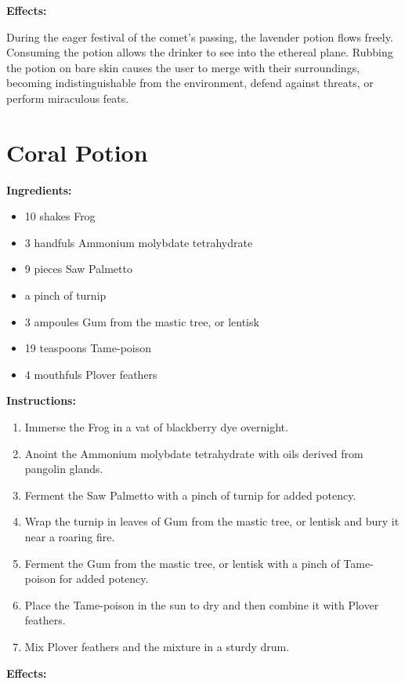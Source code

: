\documentclass{article}
\begin{document}
\textbf{Effects:}

During the eager festival of the comet’s passing, the lavender potion flows freely. Consuming the potion allows the drinker to see into the ethereal plane. Rubbing the potion on bare skin causes the user to merge with their surroundings, becoming indistinguishable from the environment, defend against threats, or perform miraculous feats.

\newpage
\section*{Coral Potion}

\textbf{Ingredients:}

\begin{itemize}
  \item 10 shakes Frog
  \item 3 handfuls Ammonium molybdate tetrahydrate
  \item 9 pieces Saw Palmetto
  \item a pinch of turnip
  \item 3 ampoules Gum from the mastic tree, or lentisk
  \item 19 teaspoons Tame-poison
  \item 4 mouthfuls Plover feathers
\end{itemize}

\textbf{Instructions:}

\begin{enumerate}
  \item Immerse the Frog in a vat of blackberry dye overnight.
  \item Anoint the Ammonium molybdate tetrahydrate with oils derived from pangolin glands.
  \item Ferment the Saw Palmetto with a pinch of turnip for added potency.
  \item Wrap the turnip in leaves of Gum from the mastic tree, or lentisk and bury it near a roaring fire.
  \item Ferment the Gum from the mastic tree, or lentisk with a pinch of Tame-poison for added potency.
  \item Place the Tame-poison in the sun to dry and then combine it with Plover feathers.
  \item Mix Plover feathers and the mixture in a sturdy drum.
\end{enumerate}

\textbf{Effects:}
\end{document}
